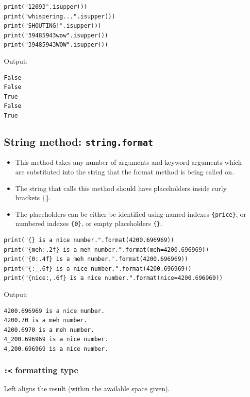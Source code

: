 \documentclass[11pt]{article}
\begin{document}
\begin{verbatim}
print("12093".isupper())
print("whispering...".isupper())
print("SHOUTING!".isupper())
print("39485943wow".isupper())
print("39485943WOW".isupper())
\end{verbatim}

 \noindent Output:

\begin{verbatim}
False
False
True
False
True
\end{verbatim}


 \newpage

\subsection{String method: \texttt{string.format}}
\label{sec:orgd28d48f}
\begin{itemize}
\item This method takes any number of arguments and keyword arguments which are substituted into the string that the format method is being called on.
\item The string that calls this method should have placeholders inside curly brackets \{\}.
\item The placeholders can be either be identified using named indexes \texttt{\{price\}}, or numbered indexes \texttt{\{0\}}, or empty placeholders \texttt{\{\}}.
\end{itemize}

\begin{verbatim}
print("{} is a nice number.".format(4200.696969))
print("{meh:.2f} is a meh number.".format(meh=4200.696969))
print("{0:.4f} is a meh number.".format(4200.696969))
print("{:_.6f} is a nice number.".format(4200.696969))
print("{nice:,.6f} is a nice number.".format(nice=4200.696969))
\end{verbatim}

 \noindent Output:

\begin{verbatim}
4200.696969 is a nice number.
4200.70 is a meh number.
4200.6970 is a meh number.
4_200.696969 is a nice number.
4,200.696969 is a nice number.
\end{verbatim}

\subsubsection{\texttt{:<} formatting type}
\label{sec:org92ac343}
Left aligns the result (within the available space given).
\end{document}
